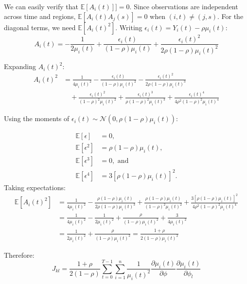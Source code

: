 We can easily verify that $\mathbb{E}[A_i(t)]]= 0$. Since observations
  are independent across time and regions, $\mathbb{E}[A_i(t) A_j(s)]=
  0$ when $(i,t) \neq (j,s)$. For the diagonal terms, we need
  $\mathbb{E}[A_i(t)^2]$. Writing $\epsilon_i(t) = Y_i(t) -
  \rho\mu_i(t)$:
\begin{equation*}
A_i(t) = -\frac{1}{2\mu_i(t)} + \frac{\epsilon_i(t)}{(1-\rho)\mu_i(t)}
+ \frac{\epsilon_i(t)^2}{2\rho(1-\rho)\mu_i(t)^2}
\end{equation*}

Expanding $A_i(t)^2$:
\begin{align*}
A_i(t)^2 &= \frac{1}{4\mu_i(t)^2} - \frac{\epsilon_i(t)}{(1-\rho)\mu_i(t)^2}
- \frac{\epsilon_i(t)^2}{2\rho(1-\rho)\mu_i(t)^3} \\
&\quad + \frac{\epsilon_i(t)^2}{(1-\rho)^2\mu_i(t)^2}
+ \frac{\epsilon_i(t)^3}{\rho(1-\rho)^2\mu_i(t)^3}
+ \frac{\epsilon_i(t)^4}{4\rho^2(1-\rho)^2\mu_i(t)^4}
\end{align*}

Using the moments of $\epsilon_i(t) \sim \mathcal{N}(0, \rho(1-\rho)\mu_i(t))$:

\begin{align*}
  \mathbb{E}[\epsilon] &= 0, \\
  \mathbb{E}[\epsilon^2] &= \rho(1-\rho)\mu_i(t), \\
  \mathbb{E}[\epsilon^3] &= 0, \text{ and } \\
  \mathbb{E}[\epsilon^4] &= 3[\rho(1-\rho)\mu_i(t)]^2.
\end{align*}
  Taking expectations:
\begin{align*}
\mathbb{E}[A_i(t)^2] &= \frac{1}{4\mu_i(t)^2}
- \frac{\rho(1-\rho)\mu_i(t)}{2\rho(1-\rho)\mu_i(t)^3}
+ \frac{\rho(1-\rho)\mu_i(t)}{(1-\rho)^2\mu_i(t)^2}
+ \frac{3[\rho(1-\rho)\mu_i(t)]^2}{4\rho^2(1-\rho)^2\mu_i(t)^4} \\
&= \frac{1}{4\mu_i(t)^2} - \frac{1}{2\mu_i(t)^2}
+ \frac{\rho}{(1-\rho)\mu_i(t)^2} + \frac{3}{4\mu_i(t)^2} \\
&= \frac{1}{2\mu_i(t)^2} + \frac{\rho}{(1-\rho)\mu_i(t)^2}
= \frac{1+\rho}{2(1-\rho)\mu_i(t)^2}
\end{align*}

Therefore:
\begin{equation}\label{eq:fim_scalar}
J_{kl} = \frac{1+\rho}{2(1-\rho)}\sum_{t=0}^{T-1}\sum_{i=1}^{n}
\frac{1}{\mu_i(t)^2} \frac{\partial \mu_i(t)}{\partial \phi}
\frac{\partial \mu_i(t)}{\partial \phi_l}
\end{equation}

